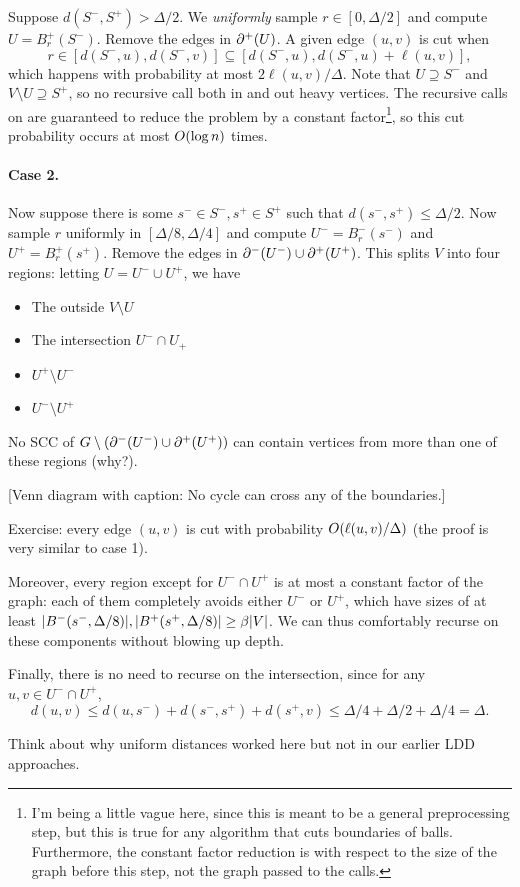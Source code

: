 \documentclass[12pt]{article}
\begin{document}
Suppose $d(S^-, S^+) > \Delta/2$. We \emph{uniformly} sample
$r \in [0, \Delta/2]$ and compute $U = B^+_r(S^-)$. Remove the edges in
$\outcut{U}$. A given edge $(u, v)$ is cut when
\[
  r \in [d(S^-, u), d(S^-, v)] \subseteq [d(S^-, u), d(S^-, u) + \ell(u, v)],
\]
which happens with probability at most $2\ell(u, v)/\Delta$. Note that
$U \supseteq S^-$ and $V \setminus U \supseteq S^+$, so no recursive call both
in and out heavy vertices. The recursive calls on are guaranteed to reduce the
problem by a constant factor\footnote{I'm being a little vague here, since this
is meant to be a general preprocessing step, but this is true for any algorithm
that cuts boundaries of balls. Furthermore, the constant factor reduction is
with respect to the size of the graph before this step, not the graph passed to
the calls.}, so this cut probability occurs at most $\bigO{\log n}$ times.

\paragraph{Case 2.}

Now suppose there is some $s^- \in S^-, s^+ \in S^+$ such that
$d(s^-, s^+) \leq \Delta/2$. Now sample $r$ uniformly in $[\Delta/8, \Delta/4]$
and compute $U^- = B^-_r(s^-)$ and $U^+ = B^+_r(s^+)$. Remove the edges in
$\incut{U^-} \cup \outcut{U^+}$. This splits $V$ into four regions: letting
$U = U^- \cup U^+$, we have
\begin{itemize}
  \item The outside $V \setminus U$
  \item The intersection $U^- \cap U_+$
  \item $U^+ \setminus U^-$
  \item $U^- \setminus U^+$
\end{itemize}
No SCC of $G \setminus (\incut{U^-} \cup \outcut{U^+})$ can contain vertices
from more than one of these regions (why?).
\begin{center}
  [Venn diagram with caption: No cycle can cross any of the boundaries.]
\end{center}

Exercise: every edge $(u, v)$ is cut with probability $\bigO{\ell(u, v)/\Delta}$
(the proof is very similar to case 1).

Moreover, every region except for $U^- \cap U^+$ is at most a constant factor of
the graph: each of them completely avoids either $U^-$ or $U^+$, which have
sizes of at least
$\sizeof{\inball{s^-, \Delta/8}}, \sizeof{\outball{s^+, \Delta/8}} \geq \beta\sizeof{V}$.
We can thus comfortably recurse on these components without blowing up depth.

Finally, there is no need to recurse on the intersection, since for any
$u, v \in U^- \cap U^+$,
\[
  d(u, v) \leq d(u, s^-) + d(s^-, s^+) + d(s^+, v)
          \leq \Delta/4 + \Delta/2 + \Delta/4
          =    \Delta.
\]

\begin{nudge}
  Think about why uniform distances worked here but not in our earlier LDD
  approaches.
\end{nudge}

\printbibliography
\end{document}

